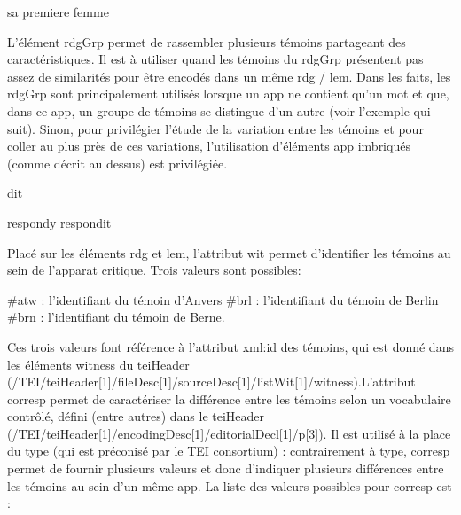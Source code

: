 \documentclass[12pt, a4paper]{article}
\begin{document}
                                 sa premiere
                                    femme
                                    
                                 
                              
                           
                        
                     L'élément rdgGrp permet de rassembler plusieurs témoins partageant des caractéristiques. Il est à utiliser quand les témoins du rdgGrp présentent pas
                        assez de similarités pour être encodés dans un même rdg / lem. Dans les faits, les rdgGrp sont principalement utilisés lorsque un app 
                        ne contient qu'un mot et que, dans ce app, un groupe de témoins se distingue d'un autre (voir l'exemple qui suit). Sinon, pour privilégier l'étude de la variation
                        entre les témoins et pour coller au plus près de ces variations, l'utilisation d'éléments app imbriqués (comme décrit au dessus) est privilégiée.
                        
                           
                              dit
                              
                                 respondy
                                 respondit
                              
                           
                        
                     Placé sur les éléments rdg et lem, l'attribut wit permet d'identifier les témoins au sein de l'apparat critique. Trois valeurs sont possibles:
                        
                           #atw : l'identifiant du témoin d'Anvers
                           #brl : l'identifiant du témoin de Berlin
                           #brn : l'identifiant du témoin de Berne.
                        
                        Ces trois valeurs font référence à l'attribut xml:id des témoins, qui est donné dans les éléments witness du teiHeader 
                        (/TEI/teiHeader[1]/fileDesc[1]/sourceDesc[1]/listWit[1]/witness).L'attribut corresp permet de caractériser la différence entre les témoins selon un vocabulaire contrôlé, défini (entre autres) dans le teiHeader 
                        (/TEI/teiHeader[1]/encodingDesc[1]/editorialDecl[1]/p[3]). Il est utilisé à la place du type (qui est préconisé par le TEI consortium) :
                        contrairement à type, corresp permet de fournir plusieurs valeurs et donc d'indiquer plusieurs différences entre les témoins au sein d'un même app. 
                        La liste des valeurs possibles pour corresp est :
                        
\end{document}
